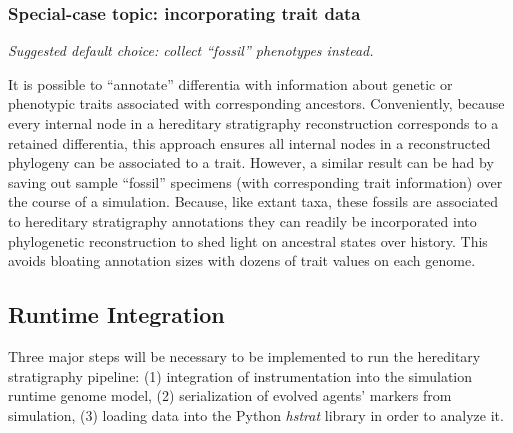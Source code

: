 \subsubsection{Special-case topic: incorporating trait data}
\textit{Suggested default choice: collect ``fossil'' phenotypes instead.}

It is possible to ``annotate'' differentia with information about genetic or phenotypic traits associated with corresponding ancestors.
Conveniently, because every internal node in a hereditary stratigraphy reconstruction corresponds to a retained differentia, this approach ensures all internal nodes in a reconstructed phylogeny can be associated to a trait.
However, a similar result can be had by saving out sample ``fossil'' specimens (with corresponding trait information) over the course of a simulation.
Because, like extant taxa, these fossils are associated to hereditary stratigraphy annotations they can readily be incorporated into phylogenetic reconstruction to shed light on ancestral states over history.
This avoids bloating annotation sizes with dozens of trait values on each genome.

\subsection{Runtime Integration}

Three major steps will be necessary to be implemented to run the hereditary stratigraphy pipeline: (1) integration of instrumentation into the simulation runtime genome model, (2) serialization of evolved agents' markers from simulation, (3) loading data into the Python \textit{hstrat} library in order to analyze it.

